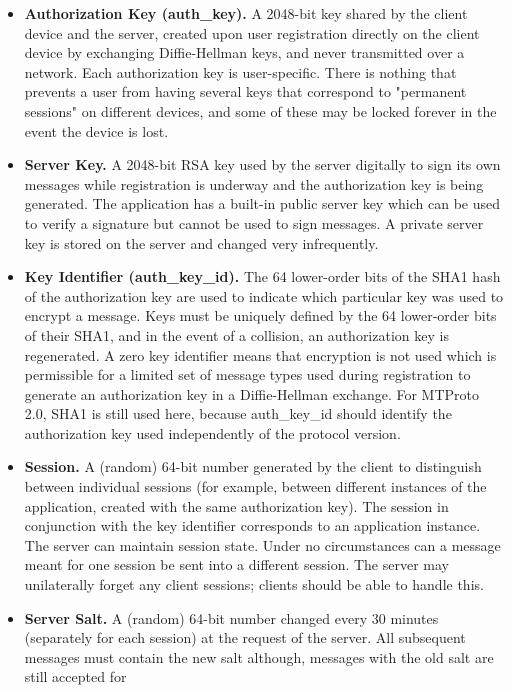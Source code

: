 \begin{itemize}
    \item \textbf{Authorization Key (auth\_key).} A 2048-bit key shared by the client device and the server,
    created upon user registration directly on the client device by exchanging Diffie-Hellman keys, and never
    transmitted over a network.
    Each authorization key is user-specific.
    There is nothing that prevents a user from having several keys that correspond to "permanent sessions"
    on different devices, and some of these may be locked forever in the event the device is lost.
    \item \textbf{Server Key.} A 2048-bit RSA key used by the server digitally to sign its own messages while
    registration is underway and the authorization key is being generated.
    The application has a built-in public server key which can be used to verify a signature but cannot be used
    to sign messages.
    A private server key is stored on the server and changed very infrequently.
    \item \textbf{Key Identifier (auth\_key\_id).} The 64 lower-order bits of the SHA1 hash of the authorization
    key are used to indicate which particular key was used to encrypt a message.
    Keys must be uniquely defined by the 64 lower-order bits of their SHA1, and in the event of a collision,
    an authorization key is regenerated.
    A zero key identifier means that encryption is not used which is permissible for a limited set of message types
    used during registration to generate an authorization key in a Diffie-Hellman exchange.
    For MTProto 2.0, SHA1 is still used here, because auth\_key\_id should identify the authorization key used
    independently of the protocol version.
    \item \textbf{Session.} A (random) 64-bit number generated by the client to distinguish between individual
    sessions (for example, between different instances of the application, created with the same authorization key).
    The session in conjunction with the key identifier corresponds to an application instance.
    The server can maintain session state.
    Under no circumstances can a message meant for one session be sent into a different session.
    The server may unilaterally forget any client sessions;
    clients should be able to handle this.
    \item \textbf{Server Salt.} A (random) 64-bit number changed every 30 minutes (separately for each session) at
    the request of the server.
    All subsequent messages must contain the new salt although, messages with the old salt are still accepted for

\end{itemize}
